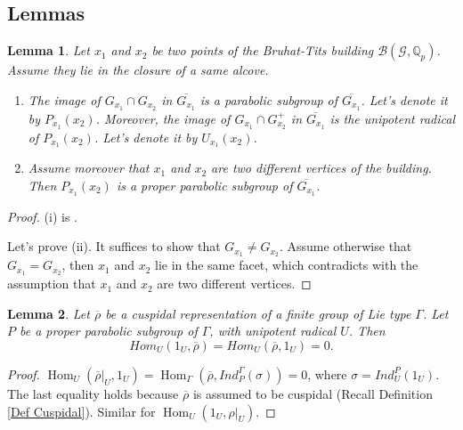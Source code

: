 \documentclass{article}
\newtheorem{lemma}{Lemma}
\newcommand{\Hom}{\operatorname{Hom}}
\begin{document}
	\subsection{Lemmas}
	
	\begin{lemma}\label{Lem Passage to Residue Field}
		Let $x_1$ and $x_2$ be two points of the Bruhat-Tits building $\mathcal{B}(\mathcal{G}, \mathbb{Q}_p)$. Assume they lie in the closure of a same alcove.
		\begin{enumerate}
			\item[(i)]   The image of $G_{x_1} \cap G_{x_2}$ in $\overline{G_{x_1}}$ is a parabolic subgroup of $\overline{G_{x_1}}$. Let's denote it by $P_{x_1}(x_2)$. Moreover, the image of $G_{x_1} \cap G_{x_2}^+$ in $\overline{G_{x_1}}$ is the unipotent radical of $P_{x_1}(x_2)$. Let's denote it by $U_{x_1}(x_2)$.
			\item[(ii)] 	Assume moreover that $x_1$ and $x_2$ are two different vertices of the building. Then $P_{x_1}(x_2)$ is a proper parabolic subgroup of $\overline{G_{x_1}}$.
		\end{enumerate}
	\end{lemma}
	
	\begin{proof}
		(i) is \cite[II.5.1.(k)]{vigneras1996representations}.
		
		Let's prove (ii). It suffices to show that $G_{x_1} \neq G_{x_2}$. Assume otherwise that $G_{x_1}=G_{x_2}$, then $x_1$ and $x_2$ lie in the same facet, which contradicts with the assumption that $x_1$ and $x_2$ are two different vertices.
	\end{proof}
	
	\begin{lemma}\label{Lem Hom_U(1_U, cusp)}
		Let $\overline{\rho}$ be a cuspidal representation of a finite group of Lie type $\Gamma$. Let $P$ be a proper parabolic subgroup of $\Gamma$, with unipotent radical $U$. Then
		$$Hom_U(1_U, \overline{\rho})=Hom_U(\overline{\rho}, 1_U)=0.$$
	\end{lemma}
	
	\begin{proof}
		$\Hom_U(\overline{\rho}|_U, 1_U)=\Hom_{\Gamma}(\overline{\rho}, Ind_P^{\Gamma}(\sigma))=0$, where $\sigma=Ind_U^P(1_U)$. The last equality holds because $\overline{\rho}$ is assumed to be cuspidal (Recall Definition \ref{Def Cuspidal}). Similar for $\Hom_U(1_U, \rho|_U)$.
	\end{proof}
	
	
	
\end{document}
